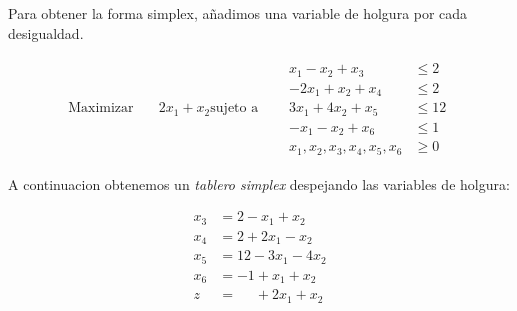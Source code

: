\documentclass{article}
\begin{document}
Para obtener la forma simplex, añadimos una variable de holgura por cada desigualdad.

\begin{equation*}
  \begin{aligned}
    \text{Maximizar} \quad & 2x_1 +x_2
    
    \text{sujeto a} \quad &
    \begin      {aligned}
      x_1-x_2+x_3 &\leq 2\\                          
      -2x_1+x_2+x_4 &\leq 2\\
      3x_1+4x_2+x_5 &\leq 12\\
     -x_1-x_2+x_6 &\leq 1\\
      x_1,x_2,x_3,x_4,x_5,x_6 &\geq 0
      \end{aligned}
  \end{aligned}
\end{equation*}

A continuacion obtenemos un \emph{tablero simplex} despejando las variables de holgura:

\begin{equation*}
  \begin{aligned}
      x_3 &=2-x_1+x_2\\                          
      x_4 &=2+2x_1-x_2\\
      x_5 &=12-3x_1-4x_2\\
     x_6 &=-1+x_1+x_2\\
     \hline
     z &=\phantom{-1}+2x_1+x_2
    \end{aligned}
\end{equation*}
\end{document}
